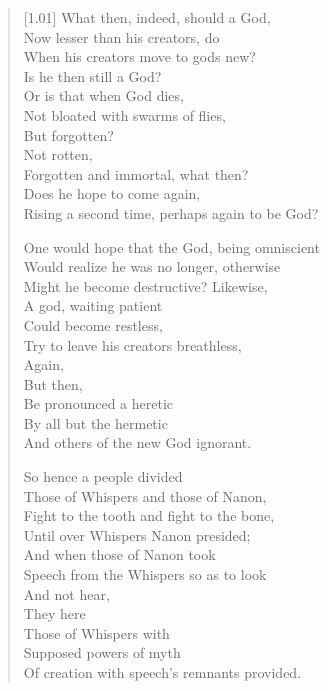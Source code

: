 \begin{paracol}{2}
\begin{leftcolumn}
\begin{verse}[1.01\textwidth]
What then, indeed, should a God,\\
\vin Now lesser than his creators, do\\
\vin When his creators move to gods new?\\
Is he then still a God?\\
\vin Or is that when God dies,\\
\vin Not bloated with swarms of flies,\\
\vin \vin But forgotten?\\
\vin \vin Not rotten,\\
\vin Forgotten and immortal, what then?\\
\vin Does he hope to come again,\\
Rising a second time, perhaps again to be God?

One would hope that the God, being omniscient\\
\vin Would realize he was no longer, otherwise\\
\vin Might he become destructive? Likewise,\\
A god, waiting patient\\
\vin Could become restless,\\
\vin Try to leave his creators breathless,\\
\vin \vin Again,\\
\vin \vin But then,\\
\vin Be pronounced a heretic\\
\vin By all but the hermetic\\
And others of the new God ignorant.\newpage

So hence a people divided\\
\vin Those of Whispers and those of Nanon,\\
\vin Fight to the tooth and fight to the bone,\\
Until over Whispers Nanon presided;\\
\vin And when those of Nanon took\\
\vin Speech from the Whispers so as to look\\
\vin \vin And not hear,\\
\vin \vin They here\\
\vin Those of Whispers with\\
\vin Supposed powers of myth\\
Of creation with speech's remnants provided.


\end{verse}
\end{leftcolumn}
\end{paracol}
